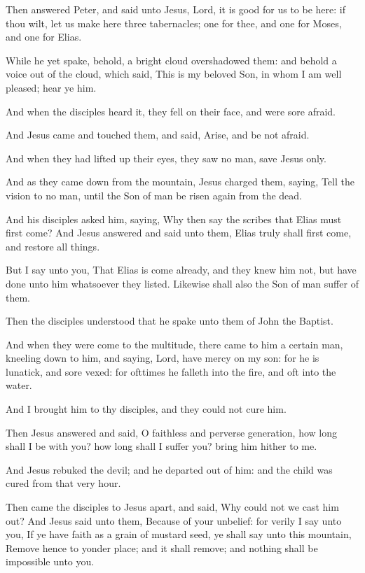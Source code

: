 \verse Then answered Peter, and said unto Jesus, Lord, it is good for us to be here: if thou wilt, let us make here three tabernacles; one for thee, and one for Moses, and one for Elias.

\verse While he yet spake, behold, a bright cloud overshadowed them: and behold a voice out of the cloud, which said, This is my beloved Son, in whom I am well pleased; hear ye him.

\verse And when the disciples heard it, they fell on their face, and were sore afraid.

\verse And Jesus came and touched them, and said, Arise, and be not afraid.

\verse And when they had lifted up their eyes, they saw no man, save Jesus only.

\verse And as they came down from the mountain, Jesus charged them, saying, Tell the vision to no man, until the Son of man be risen again from the dead.

\verse And his disciples asked him, saying, Why then say the scribes that Elias must first come?  \verse And Jesus answered and said unto them, Elias truly shall first come, and restore all things.

\verse But I say unto you, That Elias is come already, and they knew him not, but have done unto him whatsoever they listed. Likewise shall also the Son of man suffer of them.

\verse Then the disciples understood that he spake unto them of John the Baptist.

\verse And when they were come to the multitude, there came to him a certain man, kneeling down to him, and saying, \verse Lord, have mercy on my son: for he is lunatick, and sore vexed: for ofttimes he falleth into the fire, and oft into the water.

\verse And I brought him to thy disciples, and they could not cure him.

\verse Then Jesus answered and said, O faithless and perverse generation, how long shall I be with you? how long shall I suffer you?  bring him hither to me.

\verse And Jesus rebuked the devil; and he departed out of him: and the child was cured from that very hour.

\verse Then came the disciples to Jesus apart, and said, Why could not we cast him out?  \verse And Jesus said unto them, Because of your unbelief: for verily I say unto you, If ye have faith as a grain of mustard seed, ye shall say unto this mountain, Remove hence to yonder place; and it shall remove; and nothing shall be impossible unto you.

